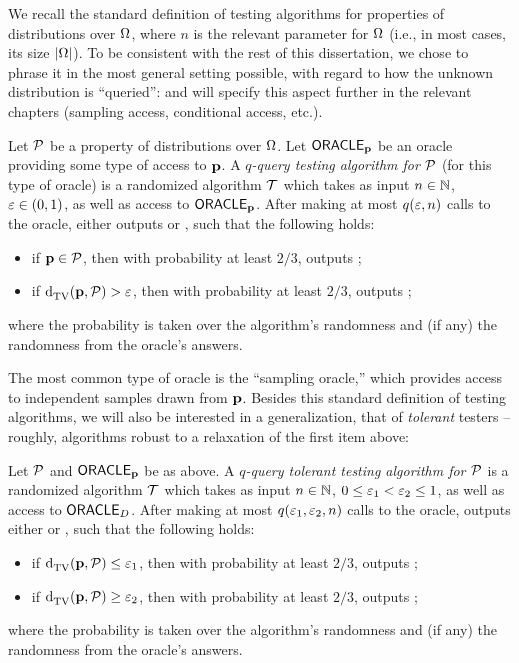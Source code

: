 We recall the standard definition of testing algorithms for properties of distributions over ${\Omega}$, where $n$ is the relevant parameter for ${\Omega}$ (i.e., in most cases, its size $\left\lvert {\Omega} \right\rvert$). To be consistent with the rest of this dissertation, we chose to phrase it in the most general setting possible, with regard to how the unknown distribution is ``queried'': and will specify this aspect further in the relevant chapters (sampling access, conditional access, etc.).
\begin{definition}\label{def:testing}
Let $\mathcal{P}$ be a property of distributions over ${\Omega}$.  Let ${\sf ORACLE}_{\mathbf{p}}$ be an oracle providing some type of access to $\mathbf{p}$. A \emph{$q$-query testing algorithm for $\mathcal{P}$} (for this type of oracle) is a randomized algorithm $\mathcal{T}$ which takes as input $n\in\mathbb{N}$, $\varepsilon\in(0,1)$, as well as access to ${\sf ORACLE}_{\mathbf{p}}$.  After making at most $q(\varepsilon,n)$ calls to the oracle, \Tester either outputs \accept or \reject, such that the following holds:
\begin{itemize}
\item if $\mathbf{p} \in \mathcal{P}$, then with probability at least $2/3$, \Tester outputs \accept;
\item if ${\operatorname{d}_{\rm{TV}}^{}\!\left({\mathbf{p}, \mathcal{P}}\right)} > \varepsilon$, then with probability at least $2/3$, \Tester outputs \reject;
\end{itemize}
where the probability is taken over the algorithm's randomness and (if any) the randomness from the oracle's answers.
\end{definition}
The most common type of oracle is the ``sampling oracle,'' which provides access to independent samples drawn from $\mathbf{p}$. Besides this standard definition of testing algorithms, we will also be interested in a generalization, that of \emph{tolerant} testers -- roughly, algorithms robust to a relaxation of the first item above:
\begin{definition}\label{def:tol:testing}
  Let $\mathcal{P}$ and ${\sf ORACLE}_{\mathbf{p}}$ be as above. A \emph{$q$-query tolerant testing algorithm for $\mathcal{P}$} is a randomized algorithm $\mathcal{T}$ which takes as input $n\in\mathbb{N}$, $0 \leq \varepsilon_1 < \varepsilon_2 \leq 1$, as well as access to ${\sf ORACLE}_D$. After making at most $q(\varepsilon_1,\varepsilon_2,n)$ calls to the oracle, \Tester outputs either \accept or \reject, such that the following holds:
  \begin{itemize}
    \item if ${\operatorname{d}_{\rm{TV}}^{}\!\left({\mathbf{p}, \mathcal{P}}\right)} \leq \varepsilon_1$, then with probability at least $2/3$, \Tester outputs \accept;
    \item if ${\operatorname{d}_{\rm{TV}}^{}\!\left({\mathbf{p}, \mathcal{P}}\right)} \geq \varepsilon_2$, then with probability at least $2/3$, \Tester outputs \reject;
  \end{itemize}
where the probability is taken over the algorithm's randomness and (if any) the randomness from the oracle's answers.
\end{definition}
